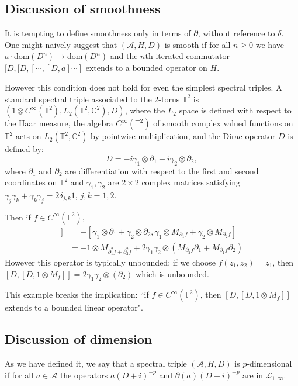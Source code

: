 \subsection{Discussion of smoothness}\label{smoothness discussion}
    It is tempting to define smoothness only in terms of $\partial$, without reference to $\delta$. One might naively suggest that $(\mathcal{A},H,D)$ is smooth if for all $n \geq 0$
    we have $a\cdot \mathrm{dom}(D^n)\to \mathrm{dom}(D^n)$ and the $n$th iterated commutator $[D,[D,[\cdots,[D,a]\cdots]$ extends to a bounded operator on $H$.
    
    However this condition does not hold for even the simplest spectral triples. A standard spectral triple associated to the $2$-torus $\mathbb{T}^2$ is
    $(1\otimes C^\infty(\mathbb{T}^2), L_2(\mathbb{T}^2,\mathbb{C}^2),D)$, where the $L_2$ space is defined with respect to the Haar measure, the algebra $C^\infty(\mathbb{T}^2)$
    {  of smooth complex valued functions on $\mathbb{T}^2$}
    acts on $L_2(\mathbb{T}^2,\mathbb{C}^2)$ by pointwise multiplication, and the Dirac operator $D$ is defined by:
    \begin{equation*}
        D = -i\gamma_1\otimes \partial_1-i\gamma_2\otimes \partial_2,
    \end{equation*}
    where $\partial_1$ and $\partial_2$ are differentiation with respect to the first and second coordinates on $\mathbb{T}^2$
    and $\gamma_1,\gamma_2$ are $2\times 2$ complex matrices satisfying $\gamma_j\gamma_k+\gamma_k\gamma_j = 2\delta_{j,k}1$, $j,k = 1,2$.
    
    Then if $f \in C^\infty(\mathbb{T}^2)$,
    \begin{align*}
        [D,[D,1\otimes M_f]] &= -[\gamma_1\otimes\partial_1+\gamma_2\otimes \partial_2,\gamma_1\otimes M_{\partial_1 f}+\gamma_2\otimes M_{\partial_2 f}]\\
                             &= -1\otimes M_{\partial_1^2f+\partial_2^2f}+2\gamma_1\gamma_2\otimes (M_{\partial_2f} \partial_1+M_{\partial_1f} \partial_2)
    \end{align*}
    However this operator is typically unbounded: if we choose $f(z_1,z_2) = z_1$, then $[D,[D,1\otimes M_f]] = 2\gamma_1\gamma_2\otimes(\partial_2)$ which is unbounded.

    This example breaks the implication: ``if $f \in C^\infty(\mathbb{T}^2)$, then $[D,[D,1\otimes M_f]]$ extends to a bounded linear operator".
    
 
\subsection{Discussion of dimension}\label{dimension discussion}
    As we have defined it, we say that a spectral triple $(\mathcal{A},H,D)$ is $p$-dimensional if for all $a \in \mathcal{A}$ the operators $a(D+i)^{-p}$ and $\partial(a)(D+i)^{-p}$ are in $\mathcal{L}_{1,\infty}$.
    
